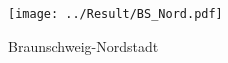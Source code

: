 \documentclass{article}
\begin{document}
    \begin{figure}[!h]
        \centering
        \texttt{[image: ../Result/BS\_Nord.pdf]}
        \caption{Braunschweig-Nordstadt}
        \label{fig:map_BS4}
    \end{figure}
    \newpage
    
%     
\end{document}
